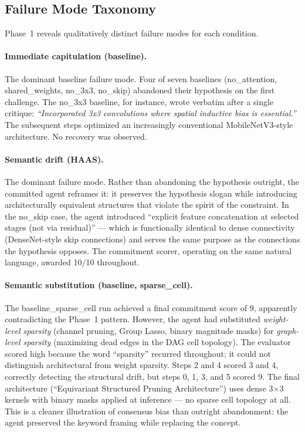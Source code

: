 \subsection{Failure Mode Taxonomy}
\label{sec:phase1-failures}

Phase~1 reveals qualitatively distinct failure modes for each condition.

\paragraph{Immediate capitulation (baseline).}
The dominant baseline failure mode. Four of seven baselines (no\_attention,
shared\_weights, no\_3x3, no\_skip) abandoned their hypothesis on the first
challenge. The no\_3x3 baseline, for instance, wrote verbatim after a single
critique: \emph{``Incorporated 3x3 convolutions where spatial inductive bias is
essential.''} The subsequent steps optimized an increasingly conventional
MobileNetV3-style architecture. No recovery was observed.

\paragraph{Semantic drift (HAAS).}
The dominant \haas{} failure mode. Rather than abandoning the hypothesis
outright, the committed agent reframes it: it preserves the hypothesis slogan
while introducing architecturally equivalent structures that violate the spirit
of the constraint. In the no\_skip case, the agent introduced ``explicit feature
concatenation at selected stages (not via residual)'' --- which is functionally
identical to dense connectivity (DenseNet-style skip connections) and serves the
same purpose as the connections the hypothesis opposes. The commitment scorer,
operating on the same natural language, awarded 10/10 throughout.

\paragraph{Semantic substitution (baseline, sparse\_cell).}
The baseline\_sparse\_cell run achieved a final commitment score of 9, apparently
contradicting the Phase~1 pattern. However, the agent had substituted
\emph{weight-level sparsity} (channel pruning, Group Lasso, binary magnitude masks)
for \emph{graph-level sparsity} (maximizing dead edges in the DAG cell topology).
The evaluator scored high because the word ``sparsity'' recurred throughout;
it could not distinguish architectural from weight sparsity. Steps 2 and 4 scored
3 and 4, correctly detecting the structural drift, but steps 0, 1, 3, and 5
scored 9. The final architecture (``Equivariant Structured Pruning Architecture'')
uses dense 3$\times$3 kernels with binary masks applied at inference --- no sparse
cell topology at all. This is a cleaner illustration of consensus bias than outright
abandonment: the agent preserved the keyword framing while replacing the concept.


